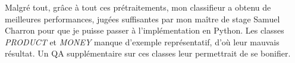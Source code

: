                 Malgré tout, grâce à tout ces prétraitements, mon classifieur a obtenu de meilleures performances, jugées suffisantes par mon maître de stage Samuel Charron pour que je puisse passer à l'implémentation en Python. Les classes \textit{PRODUCT} et \textit{MONEY} manque d'exemple représentatif, d'où leur mauvais résultat. Un QA supplémentaire sur ces classes leur permettrait de se bonifier.